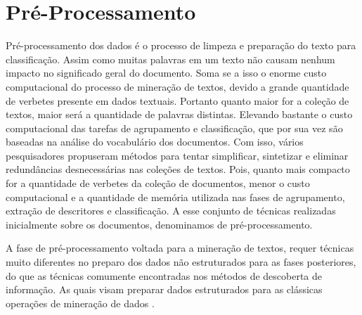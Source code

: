 %
%


\section{Pré-Processamento}
Pré-processamento dos dados é o processo de limpeza e preparação do texto para classificação.
Assim como muitas palavras em um texto não causam nenhum impacto no significado geral do documento\cite{Haddi2013}.
Soma se a isso o enorme custo computacional do processo de mineração de textos, devido a grande quantidade de verbetes presente em dados textuais. 
Portanto quanto maior for a coleção de textos, maior será a quantidade de palavras distintas. 
Elevando bastante o custo computacional das tarefas de agrupamento e classificação, 
que por sua vez são baseadas na análise do vocabulário dos documentos. 
Com isso, vários pesquisadores propuseram métodos para tentar simplificar, sintetizar e eliminar redundâncias desnecessárias nas coleções de textos.
Pois, quanto mais compacto for a quantidade de verbetes da coleção de documentos, menor o custo
computacional e a quantidade de memória utilizada nas fases de agrupamento, extração de descritores
e classificação. A esse conjunto de técnicas realizadas inicialmente sobre os documentos, 
denominamos de pré-processamento. 

A fase de pré-processamento voltada para a mineração de textos, requer técnicas muito diferentes
no preparo dos dados não estruturados para as fases posteriores, do que as técnicas comumente
encontradas nos métodos de descoberta de informação. As quais visam preparar dados estruturados para
as clássicas operações de mineração de dados \cite{Feldman2007}.

